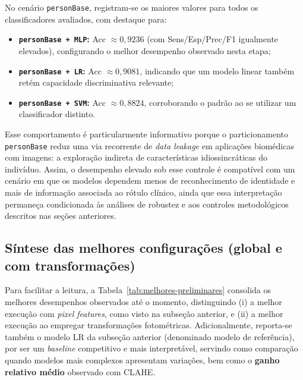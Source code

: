\documentclass[12pt,a4paper]{article}
\begin{document}
No cenário \texttt{personBase}, registram-se os maiores valores para todos os classificadores avaliados, com destaque para:
\begin{itemize}
    \item \textbf{\texttt{personBase + MLP}:} Acc \(\approx 0{,}9236\) (com Sens/Esp/Prec/F1 igualmente elevados), configurando o melhor desempenho observado nesta etapa;
    \item \textbf{\texttt{personBase + LR}:} Acc \(\approx 0{,}9081\), indicando que um modelo linear também retém capacidade discriminativa relevante;
    \item \textbf{\texttt{personBase + SVM}:} Acc \(\approx 0{,}8824\), corroborando o padrão ao se utilizar um classificador distinto.
\end{itemize}

Esse comportamento é particularmente informativo porque o particionamento \texttt{personBase} reduz uma via recorrente de \textit{data leakage} em aplicações biomédicas com imagens: a exploração indireta de características idiossincráticas do indivíduo. Assim, o desempenho elevado sob esse controle é compatível com um cenário em que os modelos dependem menos de reconhecimento de identidade e mais de informação associada ao rótulo clínico, ainda que essa interpretação permaneça condicionada às análises de robustez e aos controles metodológicos descritos nas seções anteriores.


\subsection{Síntese das melhores configurações (global e com transformações)}
Para facilitar a leitura, a Tabela~\ref{tab:melhores-preliminares} consolida os melhores desempenhos observados até o momento, distinguindo (i) a melhor execução com \textit{pixel features}, como visto na subseção anterior, e (ii) a melhor execução ao empregar transformações fotométricas. Adicionalmente, reporta-se também o modelo LR da subseção anterior (denominado modelo de referência), por ser um \textit{baseline} competitivo e mais interpretável, servindo como comparação quando modelos mais complexos apresentam variações, bem como o \textbf{ganho relativo médio} observado com CLAHE.
\end{document}
